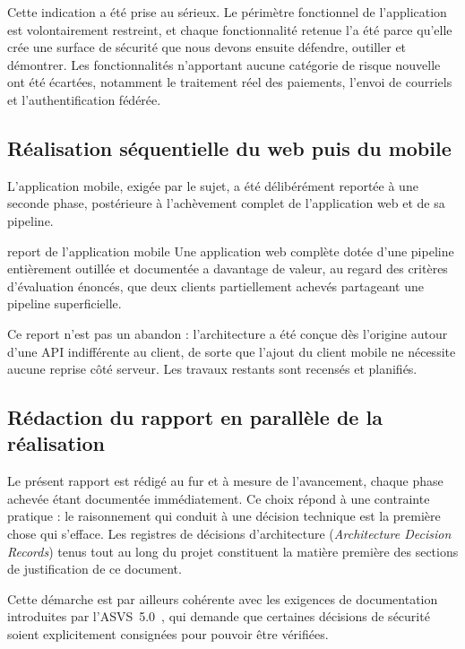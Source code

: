 Cette indication a été prise au sérieux. Le périmètre fonctionnel de
l'application est volontairement restreint, et chaque fonctionnalité retenue
l'a été parce qu'elle crée une surface de sécurité que nous devons ensuite
défendre, outiller et démontrer. Les fonctionnalités n'apportant aucune
catégorie de risque nouvelle ont été écartées, notamment le traitement réel des
paiements, l'envoi de courriels et l'authentification fédérée.

\subsection{Réalisation séquentielle du web puis du mobile}

L'application mobile, exigée par le sujet, a été délibérément reportée à une
seconde phase, postérieure à l'achèvement complet de l'application web et de sa
pipeline.

\begin{decision}{report de l'application mobile}
Une application web complète dotée d'une pipeline entièrement outillée et
documentée a davantage de valeur, au regard des critères d'évaluation énoncés,
que deux clients partiellement achevés partageant une pipeline superficielle.

Ce report n'est pas un abandon : l'architecture a été conçue dès l'origine
autour d'une API indifférente au client, de sorte que l'ajout du client mobile
ne nécessite aucune reprise côté serveur. Les travaux restants sont recensés
et planifiés.
\end{decision}

\subsection{Rédaction du rapport en parallèle de la réalisation}

Le présent rapport est rédigé au fur et à mesure de l'avancement, chaque phase
achevée étant documentée immédiatement. Ce choix répond à une contrainte
pratique : le raisonnement qui conduit à une décision technique est la première
chose qui s'efface. Les registres de décisions d'architecture
(\emph{Architecture Decision Records}) tenus tout au long du projet constituent
la matière première des sections de justification de ce document.

Cette démarche est par ailleurs cohérente avec les exigences de documentation
introduites par l'ASVS~5.0~\cite{owaspasvs5}, qui demande que certaines
décisions de sécurité soient explicitement consignées pour pouvoir être
vérifiées.

